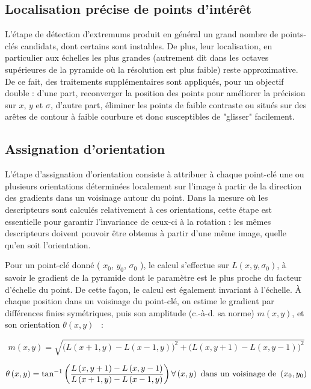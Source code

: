 \subsection{Localisation précise de points d'intérêt}
L'étape de détection d'extremums produit en général un grand nombre de points-clés candidats, dont certains sont instables. De plus, leur localisation, en particulier aux échelles les plus grandes (autrement dit dans les octaves supérieures de la pyramide où la résolution est plus faible) reste approximative. De ce fait, des traitements supplémentaires sont appliqués, pour un objectif double : d'une part, reconverger la position des points pour améliorer la précision sur $x$, $y$ et $\sigma$, d'autre part, éliminer les points de faible contraste ou situés sur des arêtes de contour à faible courbure et donc susceptibles de "glisser" facilement.

\subsection{Assignation d'orientation}
L'étape d'assignation d'orientation consiste à attribuer à chaque point-clé une ou plusieurs orientations déterminées localement sur l'image à partir de la direction des gradients dans un voisinage autour du point. Dans la mesure où les descripteurs sont calculés relativement à ces orientations, cette étape est essentielle pour garantir l'invariance de ceux-ci à la rotation : les mêmes descripteurs doivent pouvoir être obtenus à partir d'une même image, quelle qu'en soit l'orientation\cite{low04}.

Pour un point-clé donné ( $x_0$, $y_0$, $\sigma_0$ ), le calcul s'effectue sur $L ( x, y, \sigma_0 )$, à savoir le gradient de la pyramide dont le paramètre est le plus proche du facteur d'échelle du point. De cette façon, le calcul est également invariant à l'échelle. À chaque position dans un voisinage du point-clé, on estime le gradient par différences finies symétriques, puis son amplitude (c.-à-d. sa norme) $m ( x, y )$, et son orientation $\theta ( x, y )$ \cite{low04}~:

\begin{equation}
m \left( x, y \right) = \sqrt{\bigl( L \left( x+1, y \right) - L \left( x-1, y \right) \bigr)^2 + \bigl( L \left( x, y+1 \right) - L \left( x, y-1 \right) \bigr)^2}
\end{equation}

\begin{equation}
\theta \left( x, y \right) = \tan^{-1}\left(\frac{L \left( x, y+1 \right) - L \left( x, y-1 \right)}{L \left( x+1, y \right) - L \left( x-1, y \right)} \right)
\forall\left(x, y\right) \hbox{ dans un voisinage de } \left(x_0, y_0\right)
\end{equation}

